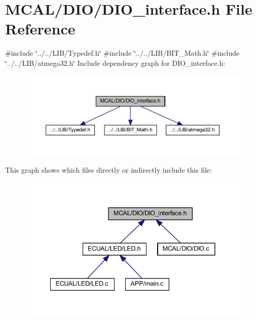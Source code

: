 \section{M\+C\+A\+L/\+D\+I\+O/\+D\+I\+O\+\_\+interface.h File Reference}
\label{_d_i_o__interface_8h}
{\ttfamily \#include \char`\"{}../../\+L\+I\+B/\+Typedef.\+h\char`\"{}}\newline
{\ttfamily \#include \char`\"{}../../\+L\+I\+B/\+B\+I\+T\+\_\+\+Math.\+h\char`\"{}}\newline
{\ttfamily \#include \char`\"{}../../\+L\+I\+B/atmega32.\+h\char`\"{}}\newline
Include dependency graph for D\+I\+O\+\_\+interface.\+h\+:
\nopagebreak
\begin{figure}[H]
\begin{center}
\leavevmode
\includegraphics[width=350pt]{_d_i_o__interface_8h__incl}
\end{center}
\end{figure}
This graph shows which files directly or indirectly include this file\+:
\nopagebreak
\begin{figure}[H]
\begin{center}
\leavevmode
\includegraphics[width=341pt]{_d_i_o__interface_8h__dep__incl}
\end{center}
\end{figure}
